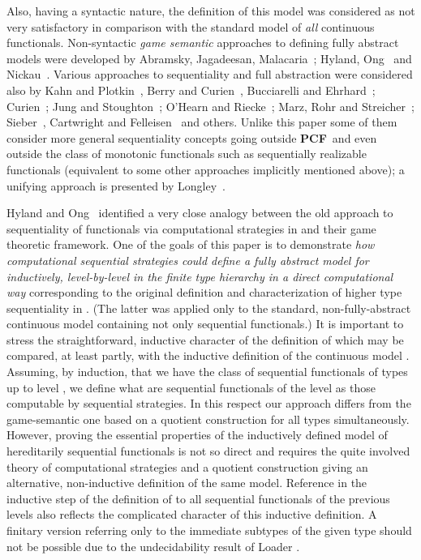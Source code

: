 \documentclass[fleqn]{LMCS}
\theoremstyle{plain}\newtheorem{satz}[thm]{Satz}
\theoremstyle{plain}\newtheorem{hyp}[thm]{Hypothesis}
\theoremstyle{plain}\newtheorem{hyps}[thm]{Hypotheses}
\theoremstyle{definition}\newtheorem{note}[thm]{Note}
\newcommand{\PCF}{\mbox{\bf PCF}}
\newcommand{\fla}[1]{}
\newcommand{\?}{\mbox{?}}
\begin{document}
Also, having a syntactic nature, 
the definition of this model was considered as 
not very satisfactory 
in comparison with the standard model of \emph{all} continuous functionals. 
Non-syntactic
\emph{game semantic} approaches 
to defining fully abstract models 
were developed by  
Abramsky, Jagadeesan, Malacaria~\cite{Abramsky-Jagadeesan2000}; 
Hyland, Ong~\cite{Hyland-Ong2000} and Nickau~\cite{Nickau96}.  
Various approaches to sequentiality and full abstraction were considered also 
by 
Kahn and Plotkin~\cite{KP93},  
Berry and Curien~\cite{BC82}, 
Bucciarelli and 
Ehrhard~\cite{BE91,BE93}; Curien~\cite{Cur92}; 
Jung and Stoughton~\cite{Jung-Stoughton93}; 
O'Hearn and Riecke~\cite{OR95}; 
Marz, Rohr and Streicher~\cite{Marz-Thesis,Marz-Rohr-Streicher}; 
Sieber~\cite{Sieber92}, 
Cartwright and Felleisen~\cite{Cartw-Fell92}
and others. Unlike this paper some of them consider more general sequentiality concepts 
going outside \PCF\ and even outside the class 
of monotonic functionals 
such as sequentially realizable functionals (equivalent to some other 
approaches implicitly mentioned above); a unifying approach is presented by 
Longley~\cite{Longley-seq-realizable}.



Hyland and Ong~\cite{Hyland-Ong2000} 
identified a very close analogy between the old approach 
to sequentiality of functionals via computational strategies in \cite{Saz76AL} 
and their game theoretic framework. 
One of the goals of this paper is to demonstrate 
\emph{how computational 
sequential strategies could define a fully abstract model  
for \fla{\PCF} inductively, level-by-level in the finite type hierarchy 
in a direct computational way} corresponding to 
the original definition and characterization of higher type sequentiality 
in \cite{Saz76SMZH,Saz76AL}. (The latter was applied only to the standard, 
non-fully-abstract continuous 
model  containing not only sequential functionals.) 
It is important to stress the straightforward, inductive 
character of the definition of  which may be compared, 
at least partly, with the inductive definition of the continuous model 
. 
Assuming, by induction, that we have 
the class of sequential functionals 
of types up to level , we define what are sequential functionals 
of the level  as those computable by sequential strategies. 
In this respect our approach differs from the game-semantic one 
based on a quotient construction for all types simultaneously. 
However, 
proving the essential properties of the inductively defined model  
of hereditarily sequential functionals is not so direct and 
requires the quite involved theory of computational strategies 
and a quotient construction  giving an alternative, non-inductive 
definition of the same model. Reference in the inductive step of the definition 
of  to all 
sequential functionals of the previous levels also reflects the complicated 
character of this inductive definition. A finitary version referring only to 
the immediate subtypes of the given type should not be possible due to 
the undecidability result 
of Loader \cite{LoaderTCS2001}. 
\end{document}

